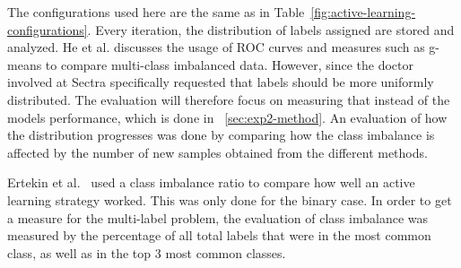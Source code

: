The configurations used here are the same as in Table~\ref{fig:active-learning-configurations}.
Every iteration, the distribution of labels assigned are stored and analyzed.
He et al\@. discusses the usage of ROC curves and measures such as g-means to compare multi-class imbalanced data.
However, since the doctor involved at Sectra specifically requested that labels should be more uniformly distributed. 
The evaluation will therefore focus on measuring that instead of the models performance, which is done in ~\ref{sec:exp2-method}.
An evaluation of how the distribution progresses was done by comparing how the class imbalance is affected by the number of new samples obtained from the different methods.

Ertekin et al\@.~\cite{ertekin2007learning} used a class imbalance ratio to compare how well an active learning strategy worked.
This was only done for the binary case.
In order to get a measure for the multi-label problem, the evaluation of class imbalance was measured by the percentage of all total labels that were in the most common class, as well as in the top 3 most common classes.
